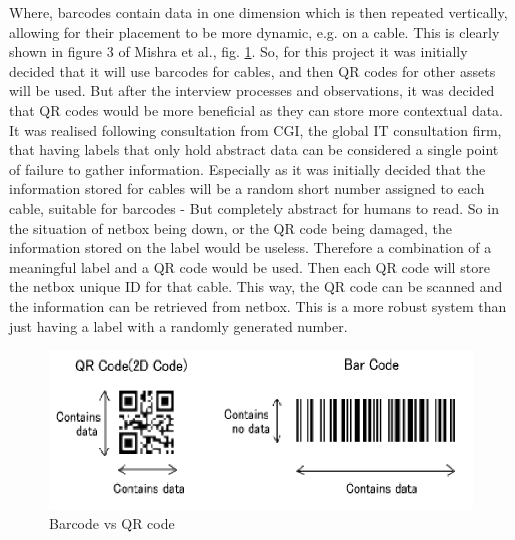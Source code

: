 \documentclass [11pt,a4paper]{article}
\begin{document}
Where, barcodes contain data in one dimension which is then repeated vertically, allowing for their placement to be more dynamic, e.g. on a cable. This is clearly shown in figure 3 of Mishra et al., fig. \ref{fig:barcode}. So, for this project it was initially decided that it will use barcodes for cables, and then QR codes for other assets will be used. But after the interview processes and observations, it was decided that QR codes would be more beneficial as they can store more contextual data. It was realised following consultation from CGI, the global IT consultation firm, that having labels that only hold abstract data can be considered a single point of failure to gather information. Especially as it was initially decided that the information stored for cables will be a random short number assigned to each cable, suitable for barcodes - But completely abstract for humans to read. So in the situation of netbox being down, or the QR code being damaged, the information stored on the label would be useless. Therefore a combination of a meaningful label and a QR code would be used. Then each QR code will store the netbox unique ID for that cable. This way, the QR code can be scanned and the information can be retrieved from netbox. This is a more robust system than just having a label with a randomly generated number.

\begin{figure}[H]
\centering
\includegraphics[width=.50\textwidth]{images/barcode_mishra.png}
\caption{Barcode vs QR code}
\label{fig:barcode}
\end{figure}
\end{document}
